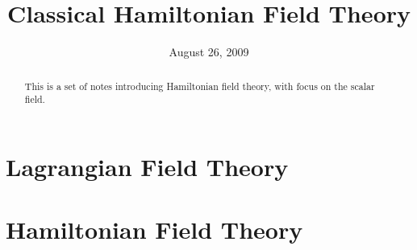 \documentclass{article}
\title{Classical Hamiltonian Field Theory}
\date{August 26, 2009}
\begin{document}
\maketitle
\begin{abstract}
This is a set of notes introducing Hamiltonian field theory, with
focus on the scalar field.
\end{abstract}
\tableofcontents

\section{Lagrangian Field Theory}

\section{Hamiltonian Field Theory}


\nocite{*}


\end{document}
